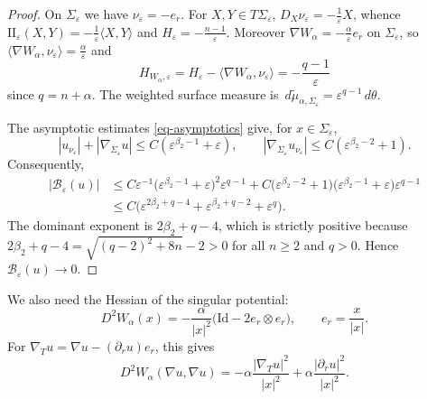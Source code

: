 \documentclass[12pt,leqno]{amsart}
\theoremstyle{plain} \newtheorem{thm}{Theorem}[section]
\theoremstyle{plain} \newtheorem{prop}[thm]{Proposition}
\theoremstyle{plain} \newtheorem{prob}[thm]{Problem}
\theoremstyle{definition} \newtheorem{defi}[thm]{Definition}
\theoremstyle{plain} \newtheorem{cor}[thm]{Corollary}
\theoremstyle{plain} \newtheorem{lem}[thm]{Lemma}
\theoremstyle{plain} \newtheorem{eg}{Example}[section]
\theoremstyle{remark} \newtheorem{rmk}[thm]{Remark}
\theoremstyle{plain} \newtheorem{conj}{Conjecture}
\numberwithin{equation}{section}
\newcommand{\Id}{\mathrm{Id}}
\newcommand{\dd}{\,d}
\begin{document}
\begin{proof}
  On $\Sigma_\varepsilon$ we have $\nu_\varepsilon=-e_r$.  For
  $X,Y\in T\Sigma_\varepsilon$,
  $D_X\nu_\varepsilon=-\frac1\varepsilon X$, whence
  $\mathrm{II}_\varepsilon(X,Y)=-\frac1\varepsilon\langle X,Y\rangle$
  and $H_\varepsilon=-\frac{n-1}{\varepsilon}$.  Moreover
  $\nabla W_\alpha=-\frac\alpha\varepsilon e_r$ on
  $\Sigma_\varepsilon$, so
  $\langle\nabla W_\alpha,\nu_\varepsilon\rangle
   =\frac\alpha\varepsilon$ and
  \[
    H_{W_\alpha,\varepsilon}
    =H_\varepsilon-\langle\nabla W_\alpha,\nu_\varepsilon\rangle
    =-\frac{q-1}{\varepsilon}
  \]
  since $q=n+\alpha$.
  The weighted surface measure is
  $\dd\tilde{\mu}_{\alpha,\Sigma_\varepsilon}
   =\varepsilon^{q-1}\dd\theta$.

  The asymptotic estimates \eqref{eq-asymptotics} give, for
  $x\in\Sigma_\varepsilon$,
  \[
    |u_{\nu_\varepsilon}|+|\nabla_{\Sigma_\varepsilon}u|
    \le C(\varepsilon^{\beta_2-1}+\varepsilon),\qquad
    |\nabla_{\Sigma_\varepsilon}u_{\nu_\varepsilon}|
    \le C(\varepsilon^{\beta_2-2}+1).
  \]
  Consequently,
  \[
    \begin{aligned}
      \bigl|\mathcal B_\varepsilon(u)\bigr|
      &\le C\varepsilon^{-1}
         \bigl(\varepsilon^{\beta_2-1}+\varepsilon\bigr)^2
         \varepsilon^{q-1}
        +C\bigl(\varepsilon^{\beta_2-2}+1\bigr)
          \bigl(\varepsilon^{\beta_2-1}+\varepsilon\bigr)
          \varepsilon^{q-1}\\[2pt]
      &\le C\bigl(
         \varepsilon^{2\beta_2+q-4}
        +\varepsilon^{\beta_2+q-2}
        +\varepsilon^{q}\bigr).
    \end{aligned}
  \]
  The dominant exponent is $2\beta_2+q-4$, which is strictly
  positive because
  $2\beta_2+q-4=\sqrt{(q-2)^2+8n}-2>0$ for all
  $n\ge2$ and $q>0$.  Hence $\mathcal B_\varepsilon(u)\to0$.
\end{proof}

We also need the Hessian of the singular potential:
\[
  D^2W_\alpha(x)
  =
  -\frac\alpha{|x|^2}\bigl(\Id-2e_r\otimes e_r\bigr),
  \qquad
  e_r=\frac x{|x|}.
\]
For $\nabla_Tu=\nabla u-(\partial_ru)e_r$, this gives
\begin{equation}\label{eq-hessian-split}
  D^2W_\alpha(\nabla u,\nabla u)
  =
  -\alpha\frac{|\nabla_Tu|^2}{|x|^2}
  +
  \alpha\frac{|\partial_ru|^2}{|x|^2}.
\end{equation}
\end{document}
